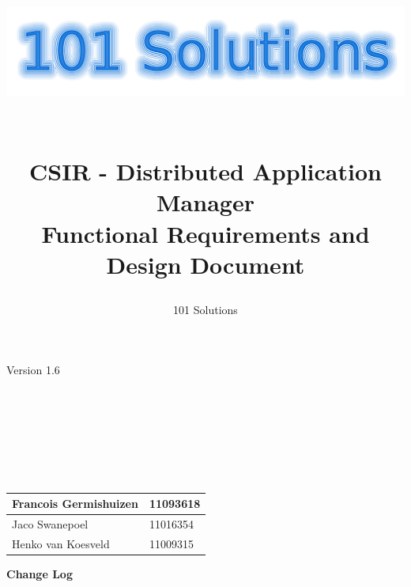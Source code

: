 \documentclass[a4paper,12pt,final]{article}
\title{
\begin{center}
  	\includegraphics[scale=0.3]{101Logo.png} 
  \end{center}
  \textbf{\\}
CSIR - Distributed Application Manager\\
Functional Requirements and Design Document\\
}
\author{101 Solutions}
\begin{document}
\maketitle
\begin{center}
Version 1.6
\end{center}
\textbf{\\}
\textbf{\\}
\textbf{\\}
\textbf{\\}
\textbf{\\}
\textbf{\\}
\begin{center}
\begin{tabular}{|l|l|}
\hline
Francois Germishuizen & 11093618\\
\hline
Jaco Swanepoel & 11016354\\
\hline
Henko van Koesveld & 11009315\\
\hline
\end{tabular}
\end{center}
\thispagestyle{empty}
\newpage
\thispagestyle{empty}
\textbf{\large{Change Log}}
\vspace{6pt}\newline
\end{document}
